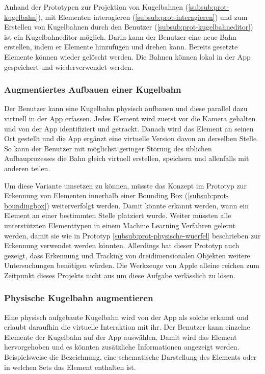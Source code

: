 Anhand der Prototypen zur Projektion von Kugelbahnen (\ref{subsub:prot-kugelbahn}), mit Elementen interagieren (\ref{subsub:prot-interagieren}) und zum Erstellen von Kugelbahnen durch den Benutzer (\ref{subsub:prot-kugelbahneditor}) ist ein Kugelbahneditor möglich.
Darin kann der Benutzer eine neue Bahn erstellen, indem er Elemente hinzufügen und drehen kann.
Bereits gesetzte Elemente können wieder gelöscht werden.
Die Bahnen können lokal in der App gespeichert und wiederverwendet werden.

\subsubsection{Augmentiertes Aufbauen einer Kugelbahn}\label{subsub:loesung-augmentiertes-aufbauen}

Der Benutzer kann eine Kugelbahn physisch aufbauen und diese parallel dazu virtuell in der App erfassen.
Jedes Element wird zuerst vor die Kamera gehalten und von der App identifiziert und getrackt.
Danach wird das Element an seinen Ort gestellt und die App ergänzt eine virtuelle Version davon an derselben Stelle.
So kann der Benutzer mit möglichst geringer Störung des üblichen Aufbauprozesses die Bahn gleich virtuell erstellen, speichern und allenfalls mit anderen teilen.

Um diese Variante umsetzen zu können, müsste das Konzept im Prototyp zur Erkennung von Elementen innerhalb einer Bounding Box (\ref{subsub:prot-boundingbox}) weiterverfolgt werden.
Damit könnte erkannt werden, wann ein Element an einer bestimmten Stelle platziert wurde.
Weiter müssten alle unterstützten Elementtypen in einem Machine Learning Verfahren gelernt werden, damit sie wie in Prototyp \ref{subsub:prot-physische-wuerfel} beschrieben zur Erkennung verwendet werden könnten.
Allerdings hat dieser Prototyp auch gezeigt, dass Erkennung und Tracking von dreidimensionalen Objekten weitere Untersuchungen benötigen würden.
Die Werkzeuge von Apple alleine reichen zum Zeitpunkt dieses Projekts nicht aus um diese Aufgabe verlässlich zu lösen.

\subsubsection{Physische Kugelbahn augmentieren}

Eine physisch aufgebaute Kugelbahn wird von der App als solche erkannt und erlaubt daraufhin die virtuelle Interaktion mit ihr.
Der Benutzer kann einzelne Elemente der Kugelbahn auf der App auswählen.
Damit wird das Element hervorgehoben und es könnten zusätzliche Informationen angezeigt werden.
Beispielsweise die Bezeichnung, eine schematische Darstellung des Elements oder in welchen Sets das Element enthalten ist.

